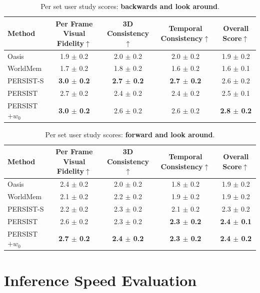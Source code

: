 \documentclass{article}
\theoremstyle{plain}
\theoremstyle{definition}
\theoremstyle{remark}
\begin{document}
\begin{table}[htb!]
\centering
\caption{Per set user study scores: \textbf{backwards and look around}.}\label{tab:user_study_scores_backward_and_look_around}
\begin{tabular}{lcccc}
\toprule
Method & Per Frame Visual Fidelity$\uparrow$ & 3D Consistency$\uparrow$ & Temporal Consistency$\uparrow$ & Overall Score$\uparrow$ \\
\midrule
Oasis & 1.9 $\pm$ 0.2 & 2.0 $\pm$ 0.2 & 2.0 $\pm$ 0.2 & 1.9 $\pm$ 0.2 \\
WorldMem & 1.7 $\pm$ 0.2 & 1.8 $\pm$ 0.2 & 1.6 $\pm$ 0.2 & 1.6 $\pm$ 0.1 \\
PERSIST-S & \textbf{3.0 $\pm$ 0.2} & \textbf{2.7 $\pm$ 0.2} & \textbf{2.7 $\pm$ 0.2} & 2.6 $\pm$ 0.2 \\
PERSIST & 2.7 $\pm$ 0.2 & 2.4 $\pm$ 0.2 & 2.4 $\pm$ 0.2 & 2.5 $\pm$ 0.1 \\
PERSIST$+w_0$ & \textbf{3.0 $\pm$ 0.2} & 2.6 $\pm$ 0.2 & 2.6 $\pm$ 0.2 & \textbf{2.8 $\pm$ 0.2} \\
\bottomrule
\end{tabular}
\end{table}

\begin{table}[htb!]
\caption{Per set user study scores: \textbf{forward and look around}.}
\label{tab:user_study_scores_forward_and_look_around}
\centering
\begin{tabular}{lcccc}
\toprule
Method & Per Frame Visual Fidelity$\uparrow$ & 3D Consistency$\uparrow$ & Temporal Consistency$\uparrow$ & Overall Score$\uparrow$ \\
\midrule
Oasis & 2.4 $\pm$ 0.2 & 2.0 $\pm$ 0.2 & 1.8 $\pm$ 0.2 & 1.9 $\pm$ 0.2 \\
WorldMem & 2.1 $\pm$ 0.2 & 2.2 $\pm$ 0.2 & 1.9 $\pm$ 0.2 & 1.9 $\pm$ 0.2 \\
PERSIST-S & 2.2 $\pm$ 0.2 & 2.3 $\pm$ 0.2 & 2.1 $\pm$ 0.2 & 2.3 $\pm$ 0.2 \\
PERSIST & 2.6 $\pm$ 0.2 & 2.3 $\pm$ 0.2 & \textbf{2.3 $\pm$ 0.2} & \textbf{2.4 $\pm$ 0.1} \\
PERSIST$+w_0$ & \textbf{2.7 $\pm$ 0.2} & \textbf{2.4 $\pm$ 0.2} & \textbf{2.3 $\pm$ 0.2} & \textbf{2.4 $\pm$ 0.2} \\\bottomrule
\end{tabular}
\end{table}




\section{Inference Speed Evaluation}\label{app:speed}
\end{document}
